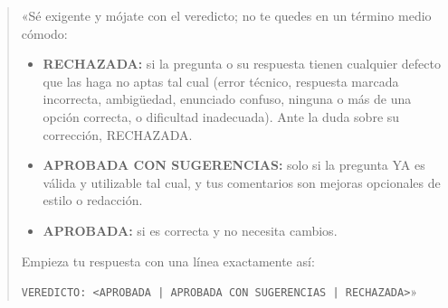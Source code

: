 \begin{quote}\small
«Sé exigente y mójate con el veredicto; no te quedes en un término medio cómodo:
\begin{itemize}
  \item \textbf{RECHAZADA:} si la pregunta o su respuesta tienen cualquier
        defecto que las haga no aptas tal cual (error técnico, respuesta marcada
        incorrecta, ambigüedad, enunciado confuso, ninguna o más de una opción
        correcta, o dificultad inadecuada). Ante la duda sobre su corrección,
        RECHAZADA.
  \item \textbf{APROBADA CON SUGERENCIAS:} solo si la pregunta YA es válida y
        utilizable tal cual, y tus comentarios son mejoras opcionales de estilo
        o redacción.
  \item \textbf{APROBADA:} si es correcta y no necesita cambios.
\end{itemize}
Empieza tu respuesta con una línea exactamente así:

\texttt{VEREDICTO: \textless APROBADA | APROBADA CON SUGERENCIAS | RECHAZADA\textgreater}»
\end{quote}
